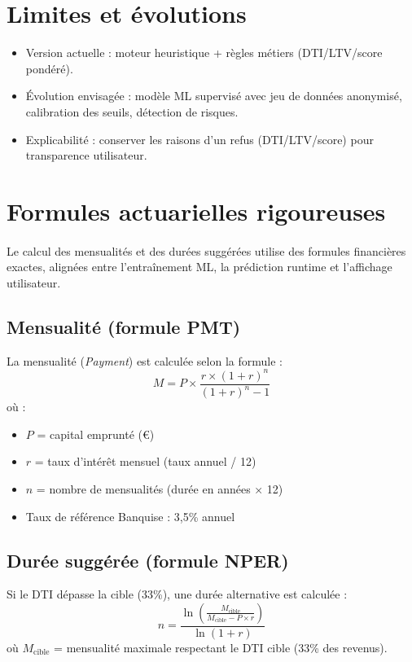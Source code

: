 \documentclass[12pt,a4paper]{report}
\begin{document}
\section{Limites et évolutions}
\begin{itemize}[leftmargin=1.3cm]
\item Version actuelle : moteur heuristique + règles métiers (DTI/LTV/score pondéré).
\item Évolution envisagée : modèle ML supervisé avec jeu de données anonymisé, calibration des seuils, détection de risques.
\item Explicabilité : conserver les raisons d'un refus (DTI/LTV/score) pour transparence utilisateur.
\end{itemize}

\section{Formules actuarielles rigoureuses}
\paragraph{}Le calcul des mensualités et des durées suggérées utilise des formules financières exactes, alignées entre l'entraînement ML, la prédiction runtime et l'affichage utilisateur.

\subsection{Mensualité (formule PMT)}
La mensualité (\textit{Payment}) est calculée selon la formule :
\[
M = P \times \frac{r \times (1+r)^n}{(1+r)^n - 1}
\]
où :
\begin{itemize}[leftmargin=1.5cm]
    \item \(P\) = capital emprunté (€)
    \item \(r\) = taux d'intérêt mensuel (taux annuel / 12)
    \item \(n\) = nombre de mensualités (durée en années × 12)
    \item Taux de référence Banquise : 3{,}5\% annuel
\end{itemize}

\subsection{Durée suggérée (formule NPER)}
Si le DTI dépasse la cible (33\%), une durée alternative est calculée :
\[
n = \frac{\ln\left(\frac{M_{\text{cible}}}{M_{\text{cible}} - P \times r}\right)}{\ln(1+r)}
\]
où \(M_{\text{cible}}\) = mensualité maximale respectant le DTI cible (33\% des revenus).
\end{document}
